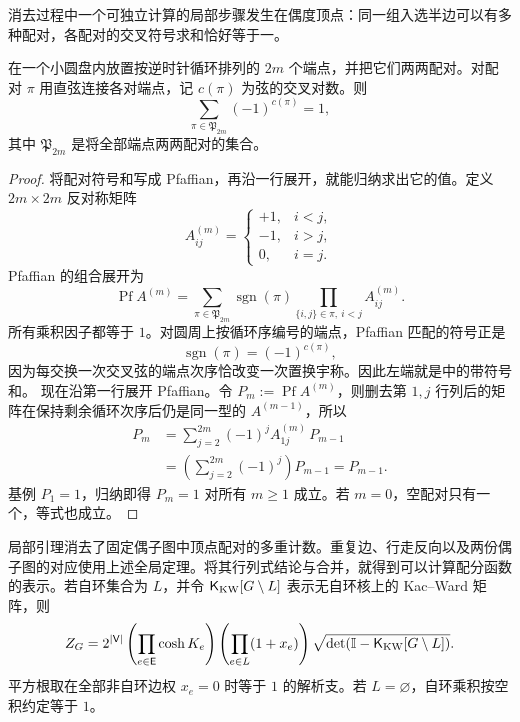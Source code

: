 消去过程中一个可独立计算的局部步骤发生在偶度顶点：同一组入选半边可以有多种配对，各配对的交叉符号求和恰好等于一。
\begin{lemma}\label{lem:phys-sm-feynman-sherman-local}
在一个小圆盘内放置按逆时针循环排列的 \(2m\) 个端点，并把它们两两配对。对配对 \(\pi\) 用直弦连接各对端点，记 \(c(\pi)\) 为弦的交叉对数。则
\begin{equation}\label{eq:phys-sm-local-pairing-cancellation}
 \sum_{\pi\in\mathfrak P_{2m}}
 (-1)^{c(\pi)}=1,
\end{equation}
其中 \(\mathfrak P_{2m}\) 是将全部端点两两配对的集合。
\end{lemma}
\begin{proof}
将配对符号和写成 Pfaffian，再沿一行展开，就能归纳求出它的值。定义 \(2m\times2m\) 反对称矩阵
\[
 A^{(m)}_{ij}
 =\begin{cases}
 +1,&i<j,\\
 -1,&i>j,\\
 0,&i=j.
 \end{cases}
\]
Pfaffian 的组合展开为
\[
 \operatorname{Pf}A^{(m)}
 =\sum_{\pi\in\mathfrak P_{2m}}
 \operatorname{sgn}(\pi)
 \prod_{\{i,j\}\in\pi,\ i<j}A^{(m)}_{ij}.
\]
所有乘积因子都等于 \(1\)。对圆周上按循环序编号的端点，Pfaffian 匹配的符号正是
\[
 \operatorname{sgn}(\pi)=(-1)^{c(\pi)},
\]
因为每交换一次交叉弦的端点次序恰改变一次置换宇称。因此左端就是中的带符号和。
现在沿第一行展开 Pfaffian。令
\(
P_m:=\operatorname{Pf}A^{(m)}
\)，则删去第 \(1,j\) 行列后的矩阵在保持剩余循环次序后仍是同一型的 \(A^{(m-1)}\)，所以
\[
\begin{aligned}
 P_m
 &=\sum_{j=2}^{2m}(-1)^j
 A^{(m)}_{1j}\,P_{m-1}\\
 &=\left(\sum_{j=2}^{2m}(-1)^j\right)P_{m-1}
 =P_{m-1}.
\end{aligned}
\]
基例 \(P_1=1\)，归纳即得 \(P_m=1\) 对所有 \(m\ge1\) 成立。若 $m=0$，空配对只有一个，等式也成立。
\end{proof}
局部引理消去了固定偶子图中顶点配对的多重计数。重复边、行走反向以及两份偶子图的对应使用上述全局定理。将其行列式结论与合并，就得到可以计算配分函数的表示。若自环集合为 \(L\)，并令 \(\mathsf K_{\rm KW}[G\setminus L]\) 表示无自环核上的 Kac--Ward 矩阵，则
\begin{equation}
 Z_G
 =2^{|\mathsf V|}\left(\prod_{e\in\mathsf E}\cosh K_e\right)
 \left(\prod_{e\in L}(1+x_e)\right)
 \sqrt{\det\!\left(\mathbb I-\mathsf K_{\rm KW}[G\setminus L]\right)}.
 \label{eq:phys-sm-kac-ward-ising}
\end{equation}
平方根取在全部非自环边权 \(x_e=0\) 时等于 \(1\) 的解析支。若 \(L=\varnothing\)，自环乘积按空积约定等于 \(1\)。
